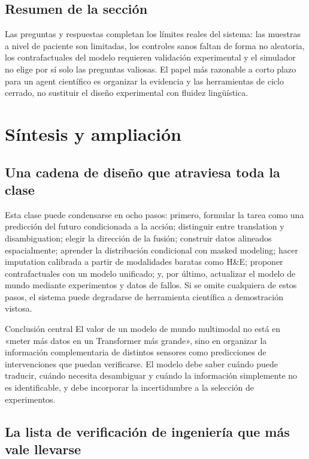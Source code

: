 \documentclass[a4paper]{article}
\begin{document}
\subsection{Resumen de la sección}

Las preguntas y respuestas completan los límites reales del sistema: las muestras a nivel de paciente son limitadas, los controles sanos faltan de forma no aleatoria, los contrafactuales del modelo requieren validación experimental y el simulador no elige por sí solo las preguntas valiosas. El papel más razonable a corto plazo para un agent científico es organizar la evidencia y las herramientas de ciclo cerrado, no sustituir el diseño experimental con fluidez lingüística.

\section{Síntesis y ampliación}

\subsection{Una cadena de diseño que atraviesa toda la clase}

Esta clase puede condensarse en ocho pasos: primero, formular la tarea como una predicción del futuro condicionada a la acción; distinguir entre translation y disambiguation; elegir la dirección de la fusión; construir datos alineados espacialmente; aprender la distribución condicional con masked modeling; hacer imputation calibrada a partir de modalidades baratas como H\&E; proponer contrafactuales con un modelo unificado; y, por último, actualizar el modelo de mundo mediante experimentos y datos de fallos. Si se omite cualquiera de estos pasos, el sistema puede degradarse de herramienta científica a demostración vistosa.

\begin{importantbox}{Conclusión central}
El valor de un modelo de mundo multimodal no está en «meter más datos en un Transformer más grande», sino en organizar la información complementaria de distintos sensores como predicciones de intervenciones que puedan verificarse. El modelo debe saber cuándo puede traducir, cuándo necesita desambiguar y cuándo la información simplemente no es identificable, y debe incorporar la incertidumbre a la selección de experimentos.
\end{importantbox}

\subsection{La lista de verificación de ingeniería que más vale llevarse}
\end{document}
